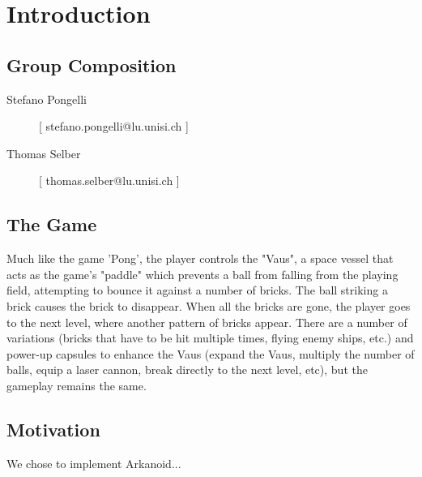 \chapter*{Introduction}
\label{cha:intro}
\section*{Group Composition}
\label{sec:group}
\begin{description}
  \item[Stefano Pongelli] [ stefano.pongelli@lu.unisi.ch ]
  \item[Thomas Selber] [ thomas.selber@lu.unisi.ch ]
\end{description}
\section*{The Game}
\label{sec:game}
Much like the game 'Pong', the player controls the "Vaus", a space vessel that acts as the game's "paddle" which prevents a ball from falling from the playing field, attempting to bounce it against a number of bricks. The ball striking a brick causes the brick to disappear. When all the bricks are gone, the player goes to the next level, where another pattern of bricks appear. There are a number of variations (bricks that have to be hit multiple times, flying enemy ships, etc.) and power-up capsules to enhance the Vaus (expand the Vaus, multiply the number of balls, equip a laser cannon, break directly to the next level, etc), but the gameplay remains the same.

\section*{Motivation}
\label{sec:moti}

We chose to implement Arkanoid...